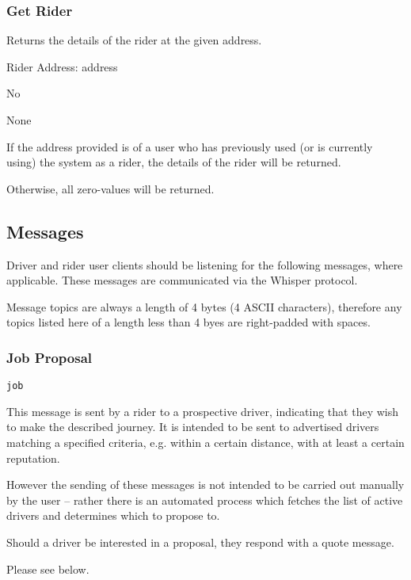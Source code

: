 \subsubsection{Get Rider}

\begin{description}[leftmargin=8em,style=nextline]
	\item [Description]
		Returns the details of the rider at the given address.
	\item [Arguments]
		Rider Address: address
	\item [Payable]
		No
	\item [Preconditions]
		None
	\item [Postconditions]
		If the address provided is of a user who has previously used (or is currently using) the system as a rider, the details of the rider will be returned.
		
		Otherwise, all zero-values will be returned.
\end{description}

\subsection{Messages}

Driver and rider user clients should be listening for the following messages, where applicable. These messages are communicated via the Whisper protocol.

Message topics are always a length of 4 bytes (4 ASCII characters), therefore any topics listed here of a length less than 4 byes are right-padded with spaces.

\subsubsection{Job Proposal}

\begin{description}[leftmargin=6em,style=nextline]
	\item [Topic]
		\lstinline{job}
	\item [Purpose]
		This message is sent by a rider to a prospective driver, indicating that they wish to make the described journey. It is intended to be sent to advertised drivers matching a specified criteria, e.g. within a certain distance, with at least a certain reputation.
		
		However the sending of these messages is not intended to be carried out manually by the user -- rather there is an automated process which fetches the list of active drivers and determines which to propose to.
	\item [Response]
		Should a driver be interested in a proposal, they respond with a quote message.
	\item [Payload]
		Please see below.
\end{description}

